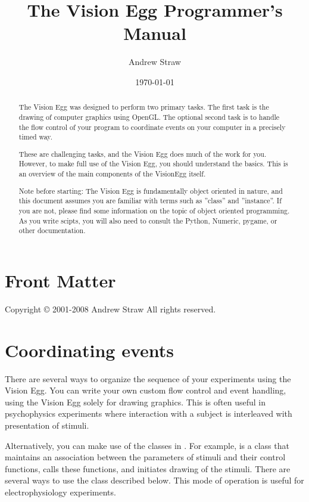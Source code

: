 \documentclass{manual}
\title{The Vision Egg Programmer's Manual}
\author{Andrew Straw}
\date{\today}			%
\begin{document}
\maketitle

\ifhtml
\chapter*{Front Matter\label{front}}
\fi

Copyright \copyright{} 2001-2008 Andrew Straw
All rights reserved.

\begin{abstract}

\noindent
The Vision Egg was designed to perform two primary tasks.  The first
task is the drawing of computer graphics using OpenGL.  The optional
second task is to handle the flow control of your program to
coordinate events on your computer in a precisely timed way.

These are challenging tasks, and the Vision Egg does much of the work
for you. However, to make full use of the Vision Egg, you should
understand the basics.  This is an overview of the main components of
the VisionEgg itself.

Note before starting: The Vision Egg is fundamentally object oriented
in nature, and this document assumes you are familiar with terms such
as ''class'' and ''instance''.  If you are not, please find some
information on the topic of object oriented programming.  As you write
scipts, you will also need to consult the Python, Numeric, pygame, or
other documentation.
\end{abstract}

\tableofcontents

\chapter{Coordinating events \label{coordinating events}}

There are several ways to organize the sequence of your experiments
using the Vision Egg.  You can write your own custom flow control and
event handling, using the Vision Egg solely for drawing graphics.
This is often useful in psychophysics experiments where interaction
with a subject is interleaved with presentation of stimuli.

Alternatively, you can make use of the classes in
.  For example,  is a class
that maintains an association between the parameters of stimuli and
their control functions, calls these functions, and initiates drawing
of the stimuli.  There are several ways to use the
 class described below.  This mode of operation is
useful for electrophysiology experiments.
\end{document}

